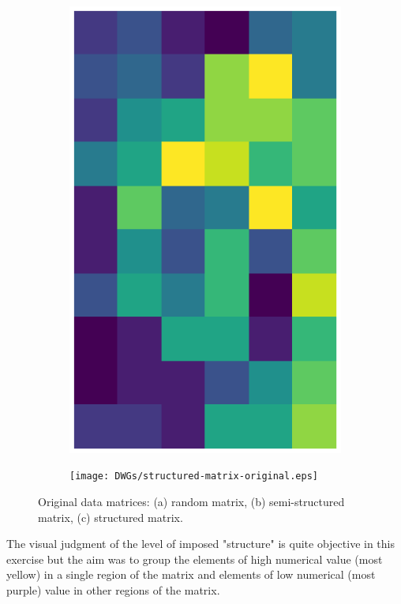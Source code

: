 \documentclass[10pt,twocolumn]{article}
\begin{document}
\begin{figure}[H]
\begin{subfigure}[t]{.15\textwidth}
\caption{ }
\end{subfigure}
\begin{subfigure}[t]{.15\textwidth}
\centering
\includegraphics[scale=.2]{DWGs/semi-structured-matrix-original.eps}
\caption{ }
\end{subfigure}
\begin{subfigure}[t]{.15\textwidth}
\centering
\texttt{[image: DWGs/structured-matrix-original.eps]}
\caption{ }
\end{subfigure}
\caption{Original data matrices: (a) random matrix, (b) semi-structured matrix, (c) structured matrix.}
\label{fig:matrices}
\end{figure}

The visual judgment of the level of imposed "structure" is quite objective in this exercise but the aim was to group the elements of high numerical value (most yellow) in a single region of the matrix and elements of low numerical (most purple) value in other regions of the matrix.
\end{document}

